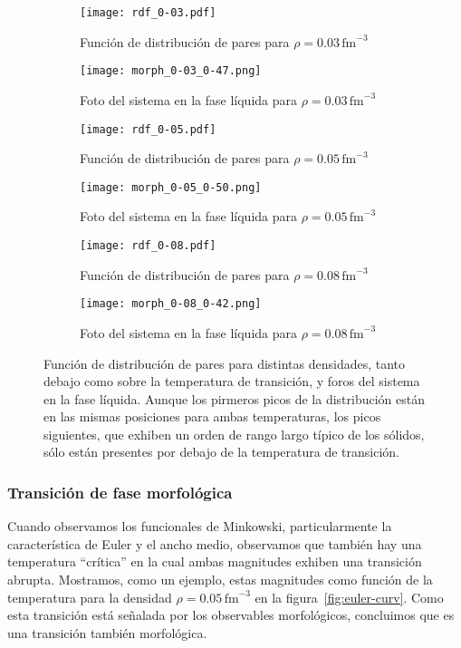 \documentclass[twocolumn,showpacs]{revtex4-1}
\begin{document}
\begin{figure*}[floatfix]
  \centering
  \begin{subfigure}[h!]{0.95\columnwidth}
    \texttt{[image: rdf\_0-03.pdf]}
    \caption{Función de distribución de pares para $\rho=0.03\,\text{fm}^{-3}$}
  \end{subfigure}
  \begin{subfigure}[h!]{0.70\columnwidth}
    \texttt{[image: morph\_0-03\_0-47.png]}
    \caption{Foto del sistema en la fase líquida para $\rho=0.03\,\text{fm}^{-3}$}
  \end{subfigure}
  \begin{subfigure}[h!]{0.95\columnwidth}
    \texttt{[image: rdf\_0-05.pdf]}
    \caption{Función de distribución de pares para $\rho=0.05\,\text{fm}^{-3}$}
  \end{subfigure}
  \begin{subfigure}[h!]{0.70\columnwidth}
    \texttt{[image: morph\_0-05\_0-50.png]}
    \caption{Foto del sistema en la fase líquida para $\rho=0.05\,\text{fm}^{-3}$}
  \end{subfigure}
  \begin{subfigure}[h!]{0.95\columnwidth}
    \texttt{[image: rdf\_0-08.pdf]}
    \caption{Función de distribución de pares para $\rho=0.08\,\text{fm}^{-3}$}
  \end{subfigure}
  \begin{subfigure}[h!]{0.70\columnwidth}
    \texttt{[image: morph\_0-08\_0-42.png]}
    \caption{Foto del sistema en la fase líquida para $\rho=0.08\,\text{fm}^{-3}$}
  \end{subfigure}
  \caption{Función de distribución de pares para distintas densidades, tanto debajo como sobre la temperatura de transición, y foros del sistema en la fase líquida.
Aunque los pirmeros picos de la distribución están en las mismas posiciones para ambas temperaturas, los picos siguientes, que exhiben un orden de rango largo típico de los sólidos, sólo están presentes por debajo de la temperatura de transición.}
  \label{fig:rdf}
\end{figure*}

\subsubsection{Transición de fase morfológica}
Cuando observamos los funcionales de Minkowski, particularmente la característica de Euler y el ancho medio, observamos que también hay una temperatura ``crítica'' en la cual ambas magnitudes exhiben una transición abrupta.
Mostramos, como un ejemplo, estas magnitudes como función de la temperatura para la densidad
$\rho=0.05\,\text{fm}^{-3}$ en la figura~\ref{fig:euler-curv}.
Como esta transición está señalada por los observables morfológicos, concluimos que es una transición también morfológica.
\end{document}
